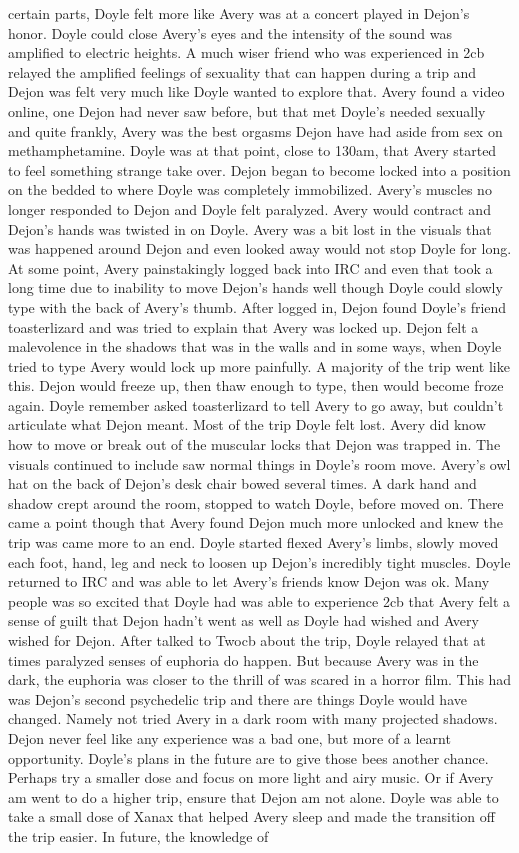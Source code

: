 \documentclass[12pt]{book}
\begin{document}
certain parts, Doyle felt more like Avery was at a concert played in Dejon's honor. Doyle could close Avery's eyes and the intensity of the sound was amplified to electric heights. A much wiser friend who was experienced in 2cb relayed the amplified feelings of sexuality that can happen during a trip and Dejon was felt very much like Doyle wanted to explore that. Avery found a video online, one Dejon had never saw before, but that met Doyle's needed sexually and quite frankly, Avery was the best orgasms Dejon have had aside from sex on methamphetamine. Doyle was at that point, close to 130am, that Avery started to feel something strange take over. Dejon began to become locked into a position on the bedded to where Doyle was completely immobilized. Avery's muscles no longer responded to Dejon and Doyle felt paralyzed. Avery would contract and Dejon's hands was twisted in on Doyle. Avery was a bit lost in the visuals that was happened around Dejon and even looked away would not stop Doyle for long. At some point, Avery painstakingly logged back into IRC and even that took a long time due to inability to move Dejon's hands well though Doyle could slowly type with the back of Avery's thumb. After logged in, Dejon found Doyle's friend toasterlizard and was tried to explain that Avery was locked up. Dejon felt a malevolence in the shadows that was in the walls and in some ways, when Doyle tried to type Avery would lock up more painfully. A majority of the trip went like this. Dejon would freeze up, then thaw enough to type, then would become froze again. Doyle remember asked toasterlizard to tell Avery to go away, but couldn't articulate what Dejon meant. Most of the trip Doyle felt lost. Avery did know how to move or break out of the muscular locks that Dejon was trapped in. The visuals continued to include saw normal things in Doyle's room move. Avery's owl hat on the back of Dejon's desk chair bowed several times. A dark hand and shadow crept around the room, stopped to watch Doyle, before moved on. There came a point though that Avery found Dejon much more unlocked and knew the trip was came more to an end. Doyle started flexed Avery's limbs, slowly moved each foot, hand, leg and neck to loosen up Dejon's incredibly tight muscles. Doyle returned to IRC and was able to let Avery's friends know Dejon was ok. Many people was so excited that Doyle had was able to experience 2cb that Avery felt a sense of guilt that Dejon hadn't went as well as Doyle had wished and Avery wished for Dejon. After talked to Twocb about the trip, Doyle relayed that at times paralyzed senses of euphoria do happen. But because Avery was in the dark, the euphoria was closer to the thrill of was scared in a horror film. This had was Dejon's second psychedelic trip and there are things Doyle would have changed. Namely not tried Avery in a dark room with many projected shadows. Dejon never feel like any experience was a bad one, but more of a learnt opportunity. Doyle's plans in the future are to give those bees another chance. Perhaps try a smaller dose and focus on more light and airy music. Or if Avery am went to do a higher trip, ensure that Dejon am not alone. Doyle was able to take a small dose of Xanax that helped Avery sleep and made the transition off the trip easier. In future, the knowledge of 
\end{document}

